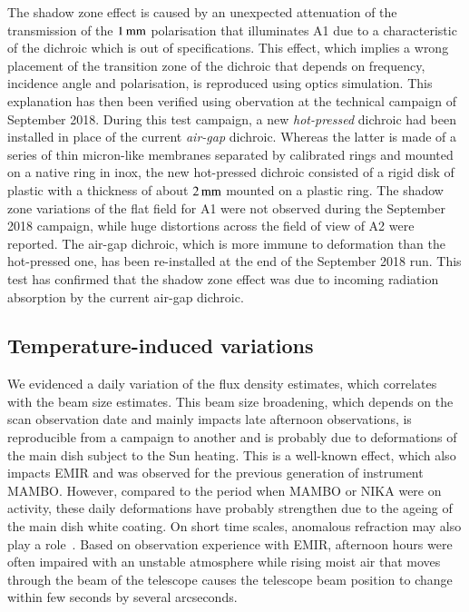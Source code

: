 The shadow zone effect is caused by an unexpected attenuation of
the transmission of the $1\,\rm{mm}$ polarisation that illuminates
A1 due to a characteristic of the dichroic which is out of
specifications.
This effect,
which implies a wrong placement of the transition zone of the dichroic
that depends on frequency, incidence angle and polarisation, is 
reproduced using optics simulation. This explanation has then been
verified using obervation at the technical campaign of September
2018. During this test campaign, a new \emph{hot-pressed} dichroic had
been installed in place of the current \emph{air-gap} dichroic.
Whereas the latter is made of a series of thin
micron-like membranes separated by calibrated rings and mounted on
a native ring in inox, the new hot-pressed dichroic consisted of a
rigid disk of plastic with a thickness of about $2\,\rm{mm}$ mounted on a
plastic ring. The shadow zone variations of the flat field for A1 were
not observed during the September 2018 campaign, while huge distortions
across the field of view of A2 were reported. The air-gap dichroic,
which is more immune to deformation than the hot-pressed one, has been
re-installed at the end of the September 2018 run. This test has
confirmed that the shadow zone effect was due to incoming radiation
absorption by the current air-gap dichroic.



\subsection{Temperature-induced variations}
\label{se:beam_variation}
We evidenced a daily variation of the flux density estimates,
which correlates with the beam size estimates.
This beam size broadening, which depends on the
scan observation date and mainly impacts late
afternoon observations, is reproducible from a campaign to another and 
is probably due to deformations of the main dish subject to the Sun
heating. This is a well-known effect, which also impacts EMIR and was
observed for the previous generation of instrument MAMBO. However,
compared to the period when MAMBO or NIKA were on activity, these
daily deformations have probably strengthen due to the ageing of the
main dish white coating. On short time scales, anomalous refraction
may also play a role~\citep{Altenhoff1987}. Based on observation
experience with EMIR, afternoon hours were often impaired with an
unstable atmosphere while rising moist air that
moves through the beam of the telescope causes the telescope beam
position to change within few seconds by several arcseconds.

